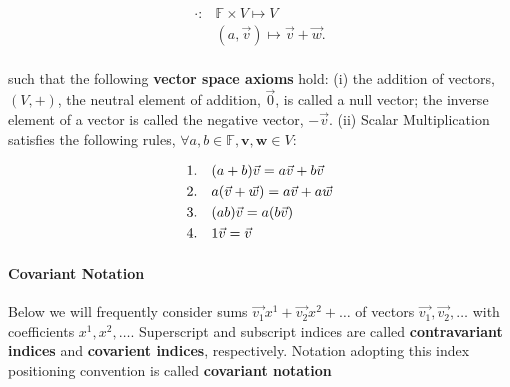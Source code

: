 \documentclass[11pt, oneside]{article}   	%
\begin{document}
\begin{align*}
  \cdot :& \mathbb{F} \times V \mapsto V \\
  &(a, \vec{v}) \mapsto \vec{v} + \vec{w}. 
\end{align*}\\ 

such that the following \textbf{vector space axioms} hold: (i) the addition of
vectors, $(V,+)$, the neutral element of addition, $\vec{0}$, is called a null
vector; the inverse element of a vector is called the negative vector,
$-\vec{v}$. (ii) Scalar Multiplication satisfies the following rules, $\forall
a, b \in \mathbb{F}, \textbf{v}, \textbf{w} \in V$: \\

\begin{tcolorbox}[colback = blue!5!white, colframe = blue!50!black, title
  = Multiplication Rules]
  \begin{align*}  
&1. \hspace{10px}(a+b)\vec{v} = a\vec{v}  + b\vec{v} \\
&2. \hspace{10px}a(\vec{v} + \vec{w}) = a\vec{v} + a\vec{w} \\
&3. \hspace{10px}(ab)\vec{v} = a(b\vec{v}) \\ 
&4. \hspace{10px}1\vec{v} = \vec{v}
  \end{align*}
\end{tcolorbox}


\paragraph{Covariant Notation}

Below we will frequently consider sums  $\vec{v_1}x^1 + \vec{v_2}x^2 + \dots
$ of vectors $\vec{v_1},\vec{v_2},\dots$ with coefficients $x^1,x^2,\dots$.
Superscript and subscript indices are called  \textbf{contravariant indices}
and \textbf{covarient indices}, respectively. Notation adopting this index
positioning convention is called \textbf{covariant notation}  
\end{document}
